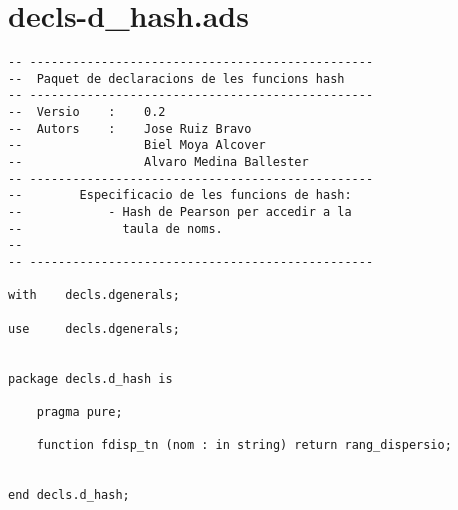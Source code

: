 \documentclass[10pt]{report}
\begin{document}
    \section{decls-d\_hash.ads}
    \begin{lstlisting}[style=Ada]
-- ------------------------------------------------
--  Paquet de declaracions de les funcions hash
-- ------------------------------------------------
--  Versio    :    0.2
--  Autors    :    Jose Ruiz Bravo
--                 Biel Moya Alcover
--                 Alvaro Medina Ballester
-- ------------------------------------------------
--        Especificacio de les funcions de hash:
--            - Hash de Pearson per accedir a la 
--              taula de noms.
--
-- ------------------------------------------------

with    decls.dgenerals;

use     decls.dgenerals;


package decls.d_hash is

    pragma pure;

    function fdisp_tn (nom : in string) return rang_dispersio;
    
    
end decls.d_hash;
    \end{lstlisting}
    \newpage
    
    
\end{document}
